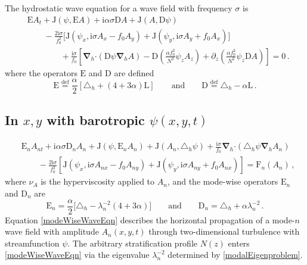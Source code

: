 \documentclass[12pt, oneside]{article}
\newcommand{\com}{\, ,}
\newcommand{\per}{\, .}
\newcommand{\defn}{\ensuremath{\stackrel{\mathrm{def}}{=}}}
\newcommand{\beq}{\begin{equation}}
\newcommand{\eeq}{\end{equation}}
\newcommand{\p}{\partial}
\newcommand{\bnabla}{\boldsymbol \nabla}
\newcommand{\hnabla}{\bnabla_{\! \! h}}
\newcommand{\bcdot}{\boldsymbol \cdot}
\newcommand{\hlap}{\triangle_h}
\newcommand{\ii}{\mathrm{i}}
\newcommand{\J}{\mathrm{J}}
\renewcommand{\L}{\mathrm{L}}
\newcommand{\friction}{\mathrm{F}}
\newcommand{\wave}{\mathrm{E}}
\newcommand{\disp}{\mathrm{D}}
\begin{document}
The hydrostatic wave equation for a wave field with frequency $\sigma$ is
\beq
\begin{split}
& \wave A_{t} + \J \left ( \psi , \wave A \right ) + \ii \alpha \sigma \disp A  + \J \left ( A, \disp \psi \right )  \\
& \qquad - \tfrac{2 \ii \sigma}{f_0^2} \Big [  \J \left ( \psi_x , \ii \sigma A_x - f_0 A_y \right ) +  \J \left ( \psi_y , \ii \sigma A_y + f_0 A_x \right ) \Big ] \\
& \qquad \qquad + \tfrac{ \ii \sigma}{f_0}  \left [ \hnabla \bcdot \left ( \disp \psi \hnabla A \right ) - \disp \left ( \tfrac{\alpha f_0^2}{N^2} \psi_z A_z \right ) + \p_z \left ( \tfrac{\alpha f_0^2}{N^2} \psi_z \disp A \right ) \right ]  =0 \per
\end{split}
\label{internalTideEqnRemodeling}
\eeq
where the operators $\wave$ and $\disp$ are defined
\beq
\wave \defn \frac{\alpha}{2} \left [ \hlap + \left (4  + 3 \alpha \right ) \L \right ] \qquad \text{and} \qquad \disp \defn \hlap - \alpha \L \per
\eeq

\subsection{In $x,y$ with barotropic $\psi(x, y, t)$}

\beq
\begin{split}
& \wave_n A_{nt} + \ii \alpha \sigma \disp_n A_n +  \J \left ( \psi, \wave_n A_n \right ) + \J \left ( A_n, \hlap \psi \right ) + \tfrac{\ii \sigma}{f_0} \hnabla \bcdot \left ( \hlap \psi \hnabla A_n \right ) \\
&  \qquad - \tfrac{2 \ii \sigma}{f_0^2} \left [ \J \left ( \psi_x, \ii \sigma A_{nx} - f_0 A_{ny} \right ) + \J \left ( \psi_y, \ii \sigma A_{ny} + f_0 A_{nx} \right )  \right ] = \friction_n \left ( A_n \right ) \com
\end{split}
\label{modeWiseWaveEqn}
\eeq
where $\nu_A$ is the hyperviscosity applied to $A_n$, and the mode-wise operators $\wave_n$ and $\disp_n$ are
\beq
\wave_n = \frac{\alpha}{2} \Big [ \hlap - \lambda_n^{-2} \left ( 4 + 3 \alpha \right ) \Big ] \qquad \text{and} \qquad \disp_n = \hlap + \alpha \lambda_n^{-2} \per
\eeq
Equation \eqref{modeWiseWaveEqn} describes the horizontal propagation of a mode-$n$ wave field with amplitude $A_n(x,y,t)$ through two-dimensional turbulence with streamfunction $\psi$.  The arbitrary stratification profile $N(z)$ enters \eqref{modeWiseWaveEqn} via the eigenvalue $\lambda_n^{-2}$ determined by \eqref{modalEigenproblem}.
\end{document}
